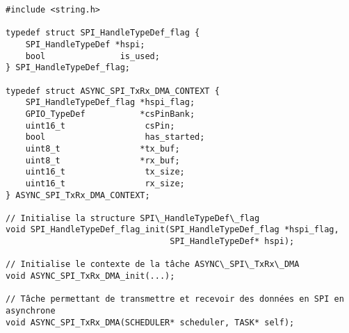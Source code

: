 \begin{lstlisting}[style=prog, frame=shadowbox, caption={Définition des outlis spi suplémentaires (tools.h)}, label={lst:tools_h},
    emph={[1]SPI_HandleTypeDef_flag_init, ASYNC_SPI_TxRx_DMA_init, ASYNC_SPI_TxRx_DMA, add_task, kill_task, run_task,
    run_scheduler}, emphstyle={[1]\color{C}},
    emph={[2]GPIO_TypeDef, SCHEDULER, TASK, SPI_HandleTypeDef, SPI_HandleTypeDef_flag, ASYNC_DMA_STATE, ASYNC_SPI_TxRx_DMA_CONTEXT}, emphstyle={[2]\color{E}}]
#include <string.h>

typedef struct SPI_HandleTypeDef_flag {
    SPI_HandleTypeDef *hspi;
    bool               is_used;
} SPI_HandleTypeDef_flag;

typedef struct ASYNC_SPI_TxRx_DMA_CONTEXT {
    SPI_HandleTypeDef_flag *hspi_flag;
    GPIO_TypeDef           *csPinBank;
    uint16_t                csPin;
    bool                    has_started;
    uint8_t                *tx_buf;
    uint8_t                *rx_buf;
    uint16_t                tx_size;
    uint16_t                rx_size;
} ASYNC_SPI_TxRx_DMA_CONTEXT;

// Initialise la structure SPI\_HandleTypeDef\_flag
void SPI_HandleTypeDef_flag_init(SPI_HandleTypeDef_flag *hspi_flag,
                                 SPI_HandleTypeDef* hspi);

// Initialise le contexte de la tâche ASYNC\_SPI\_TxRx\_DMA
void ASYNC_SPI_TxRx_DMA_init(...);

// Tâche permettant de transmettre et recevoir des données en SPI en asynchrone
void ASYNC_SPI_TxRx_DMA(SCHEDULER* scheduler, TASK* self);
\end{lstlisting}

\newpage

